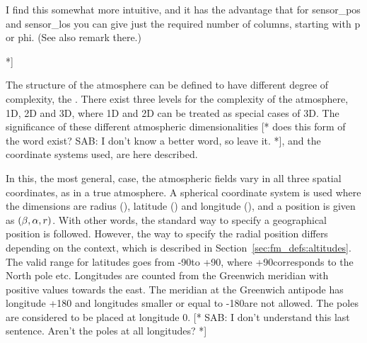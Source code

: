 I find this somewhat more intuitive, and it has the advantage that for
sensor\_pos and sensor\_los you can give just the required number of
columns, starting with p or phi. (See also remark there.)

*]



\label{sec:fm_defs:atmosphere}


\label{sec:fm_defs:atmdim}

The structure of the atmosphere can be defined to have different
degree of complexity, the . There
exist three levels for the complexity of the atmosphere, 1D, 2D and
3D, where 1D and 2D can be treated as special cases of 3D. The
significance of these different atmospheric dimensionalities [* does
this form of the word exist? SAB: I don't know a better word, so leave
it. *], and the coordinate systems used, are
here described.

 In this, the most general, case, the
atmospheric fields vary in all three spatial coordinates, as in a true
atmosphere. A spherical coordinate system is used where the dimensions
are radius (\Rds), latitude (\Lat) and longitude (\Lon), and a
position is given as $(\beta,\alpha,r)$. With other words, the
standard way to specify a geographical position is followed. However,
the way to specify the radial position differs depending on the
context, which is described in Section~\ref{sec:fm_defs:altitudes}.
The valid range for latitudes goes from -90\degree to +90\degree,
where +90\degree corresponds to the North pole etc. Longitudes are
counted from the Greenwich meridian with positive values towards the
east. The meridian at the Greenwich antipode has longitude +180\degree
and longitudes smaller or equal to -180\degree are not allowed. The
poles are considered to be placed at longitude 0\degree. [* SAB: I
don't understand this last sentence. Aren't the poles at all
longitudes? *]

